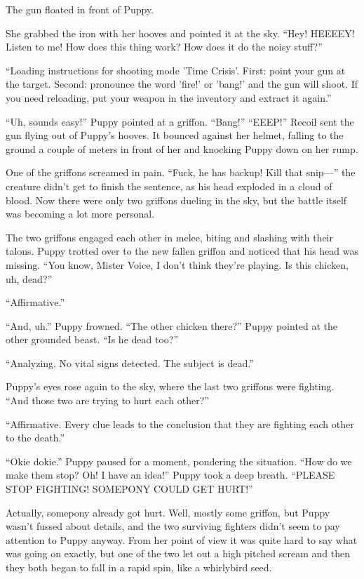 The gun floated in front of Puppy.

She grabbed the iron with her hooves and pointed it at the sky. ``Hey! HEEEEY! Listen to me! How does this thing work? How does it do the noisy stuff?''

{\mt ``Loading instructions for shooting mode 'Time Crisis'. First: point your gun at the target. Second: pronounce the word 'fire!' or 'bang!' and the gun will shoot. If you need reloading, put your weapon in the inventory and extract it again.''}

``Uh, sounds easy!'' Puppy pointed at a griffon. ``Bang!''   ``EEEP!'' Recoil sent the gun flying out of Puppy's hooves. It bounced against her helmet, falling to the ground a couple of meters in front of her and knocking Puppy down on her rump.

One of the griffons screamed in pain. ``Fuck, he has backup! Kill that snip---'' the creature didn't get to finish the sentence, as his head exploded in a cloud of blood. Now there were only two griffons dueling in the sky, but the battle itself was becoming a lot more personal.

The two griffons engaged each other in melee, biting and slashing with their talons. Puppy trotted over to the new fallen griffon and noticed that his head was missing. ``You know, Mister Voice, I don't think they're playing. Is this chicken, uh, dead?''

{\mt ``Affirmative.''}

``And, uh.'' Puppy frowned. ``The other chicken there?'' Puppy pointed at the other grounded beast. ``Is he dead too?''

{\mt ``Analyzing. No vital signs detected. The subject is dead.''}

Puppy's eyes rose again to the sky, where the last two griffons were fighting. ``And those two are trying to hurt each other?''

{\mt ``Affirmative. Every clue leads to the conclusion that they are fighting each other to the death.''}

``Okie dokie.'' Puppy paused for a moment, pondering the situation. ``How do we make them stop? Oh! I have an idea!'' Puppy took a deep breath. ``PLEASE STOP FIGHTING! SOMEPONY COULD GET HURT!''

Actually, somepony already got hurt. Well, mostly some griffon, but Puppy wasn't fussed about details, and the two surviving fighters didn't seem to pay attention to Puppy anyway. From her point of view it was quite hard to say what was going on exactly, but one of the two let out a high pitched scream and then they both began to fall in a rapid spin, like a whirlybird seed.

